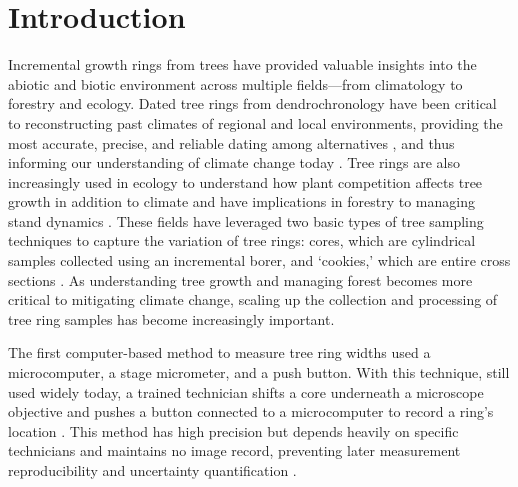 \documentclass[a4paper,12pt]{article}
\begin{document}
\begin{abstract}

\end{abstract}

\section{Introduction} %
Incremental growth rings from trees have provided valuable insights into the abiotic and biotic environment across multiple fields---from climatology to forestry and ecology. Dated tree rings from dendrochronology have been critical to
reconstructing past climates of regional and local environments, providing the most accurate, precise, and reliable dating among alternatives \citep{mann_northern_1999}, and thus informing  our understanding of climate change today \citep{fritts_dendroclimatology_1971,williams_using_2010,guibal_dendrochronology_2021,sheppard_dendroclimatology_2010,williams_large_2020}. Tree rings are also increasingly used in ecology to understand how plant competition affects tree growth in addition to climate \citep{buechling_climate_2017} and have implications in forestry to managing stand dynamics \citep{canham_neighborhood_2004}. These fields have leveraged two basic types of tree sampling techniques to capture the variation of tree rings: cores, which are cylindrical samples collected using an incremental borer, and `cookies,' which are entire cross sections \citep[and thus allow measuring as many radii from the sample as desired,][]{speer_fundamentals_2010}. As understanding tree growth and managing forest becomes more critical to mitigating climate change, scaling up the collection and processing of tree ring samples has become increasingly important.

The first computer-based method to measure tree ring widths used a microcomputer, a stage micrometer, and a push button. With this technique, still used widely today, a trained technician shifts a core underneath a microscope objective and pushes a button connected to a microcomputer to record a ring's location \citep{robinson_microcomputer_1980}.
This method has high precision but depends heavily on specific technicians and maintains no image record, preventing later measurement reproducibility and uncertainty quantification \citep{levanic_atrics_2007}.
\end{document}
